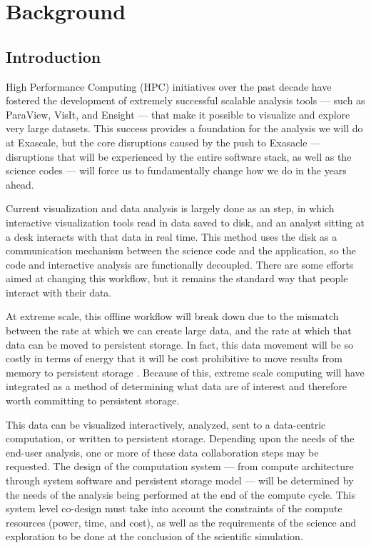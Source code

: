 \section{Background}
\label{sec:Background}

\subsection{Introduction}

High Performance Computing (HPC) initiatives over the past decade have 
fostered the development of extremely successful scalable analysis tools ---
such as ParaView, VisIt, and Ensight --- that make it possible to visualize 
and explore very large datasets.  This success provides a foundation for 
the analysis we will do at Exascale, but the core disruptions caused by
the push to Exasacle --- disruptions that will be experienced by the entire
software stack, as well as the science codes --- will force us to fundamentally
change how we do \vda in the years ahead.

Current visualization and data analysis is largely done as an
 step, in which interactive visualization
tools read in data saved to disk, and an analyst sitting at a desk
interacts with that data in real time.  This method uses the disk as a
communication mechanism between the science code and the \vda application,
so the code and interactive analysis are functionally decoupled.  There are
some efforts aimed at changing this workflow, but it remains the standard
way that people interact with their data.

At extreme scale, this offline workflow will break down due to 
the mismatch
between the rate at which we can create large data, and the rate at
which that data can be moved to persistent storage.  In fact, this
data movement will be so costly in terms of energy that it will be
cost prohibitive to move results from memory to persistent storage 
.
Because of this, extreme scale computing will have integrated \vda as a
method of determining what data are of interest and therefore worth
committing to persistent storage.

This data can be visualized interactively, analyzed,
sent to a data-centric computation, or written to persistent
storage.  Depending upon the needs of the end-user analysis, one or
more of these data collaboration steps may be requested.  The design
of the computation system --- from compute architecture through system
software and persistent storage model --- will be determined by the
needs of the analysis being performed at the end of the compute
cycle.  This system level co-design must take into account the
constraints of the compute resources (power, time, and cost), as
well as the requirements of the science and exploration to be done
at the conclusion of the scientific simulation.

